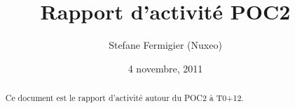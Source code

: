 \documentclass[a4paper,11pt]{article}
\title{Rapport d'activité POC2}
\date{4 novembre, 2011}
\author{Stefane Fermigier (Nuxeo)}
\begin{document}
\maketitle
\begin{abstract}
  Ce document est le rapport d'activité autour du POC2 à T0+12.
\end{abstract}

\tableofcontents

\pagebreak


\end{document}
